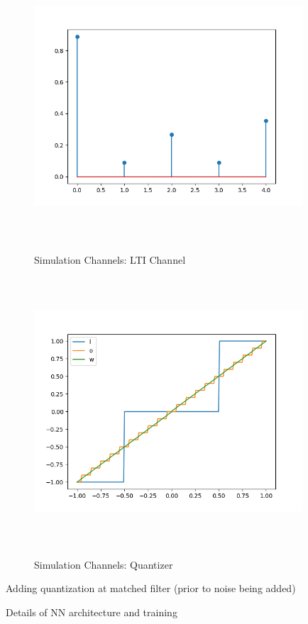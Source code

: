 \documentclass[12pt,a4paper]{report}
\begin{document}
\begin{figure}[H]
	  \caption{Simulation Channels: LTI Channel}
	\includegraphics[width=10cm,height = 10cm]{system_model/lti_channel}
	  \label{fig:LTI Channel}
\end{figure}
\begin{figure}[H]
	  \caption{Simulation Channels: Quantizer}
	\includegraphics[width=10cm,height = 10cm]{system_model/quantizer}
	  \label{fig:Quantized Channel}
\end{figure}



Adding quantization at matched filter (prior to noise being added)


Details of NN architecture and training
\end{document}
